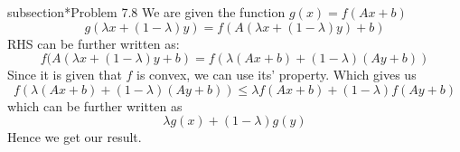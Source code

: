 \documentclass[letterpaper,12pt]{article}
\theoremstyle{definition}
\begin{document}
subsection*{Problem 7.8}
We are given the function $ g(x) =  f(Ax+b) $ 
\begin{equation*}
    g(\lambda x + (1-\lambda) y) =  f(A(\lambda x + (1-\lambda)y) + b)
\end{equation*}
RHS can be further written as:
\begin{equation*}
     f(A(\lambda x + (1-\lambda)y + b) = f(\lambda(Ax+b) + (1-\lambda)(Ay+b))
\end{equation*}
Since it is given that $f$ is convex, we can use its' property. Which gives us 
\begin{equation*}
    f(\lambda(Ax+b) + (1-\lambda)(Ay+b)) \leq  \lambda f(Ax+b) + (1-\lambda)f(Ay+b)
\end{equation*}
which can be further written as
\begin{equation*}
    \lambda g(x) + (1-\lambda)g(y)
\end{equation*}
Hence we get our result.
\end{document}
